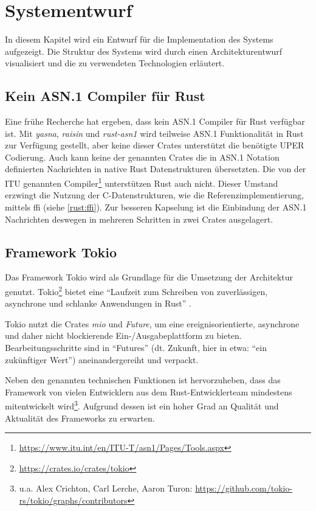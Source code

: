 
\chapter{Systementwurf}

In diesem Kapitel wird ein Entwurf für die Implementation des Systems aufgezeigt.
Die Struktur des Systems wird durch einen Architekturentwurf visualisiert und die zu verwendeten Technologien erläutert.

\section{Kein ASN.1 Compiler für Rust}
\label{draft:no_asn_compiler}

Eine frühe Recherche hat ergeben, dass kein ASN.1 Compiler für Rust verfügbar ist.
Mit \textit{yasna}, \textit{raisin} und \textit{rust-asn1} wird teilweise ASN.1 Funktionalität in Rust zur Verfügung gestellt, aber keine dieser Crates unterstützt die benötigte UPER Codierung.
Auch kann keine der genannten Crates die in ASN.1 Notation definierten Nachrichten in native Rust Datenstrukturen übersetzten.
Die von der ITU genannten Compiler\footnote{\url{https://www.itu.int/en/ITU-T/asn1/Pages/Tools.aspx}} unterstützen Rust auch nicht.
Dieser Umstand erzwingt die Nutzung der C-Datenstrukturen, wie die Referenzimplementierung, mittels \gls{ffi} (siehe \autoref{rust:ffi}).
Zur besseren Kapselung ist die Einbindung der ASN.1 Nachrichten deswegen in mehreren Schritten in zwei Crates ausgelagert.

\section{Framework Tokio}
\label{design:tokio}

Das Framework Tokio wird als Grundlage für die Umsetzung der Architektur genutzt.
Tokio\footnote{\url{https://crates.io/crates/tokio}} bietet eine \enquote{Laufzeit zum Schreiben von zuverlässigen, asynchrone und schlanke Anwendungen in Rust} \cite{rust:crate:tokio}.

Tokio nutzt die Crates \textit{mio} und \textit{Future}, um eine ereignisorientierte, asynchrone und daher nicht blockierende Ein-/Ausgabeplattform zu bieten.
Bearbeitungsschritte sind in \enquote{Futures} (dt. Zukunft, hier in etwa: \enquote{ein zukünftiger Wert}) aneinandergereiht und verpackt.

Neben den genannten technischen Funktionen ist hervorzuheben, dass das Framework von vielen Entwicklern aus dem Rust-Entwicklerteam mindestens mitentwickelt wird\footnote{u.a. Alex Crichton, Carl Lerche, Aaron Turon: \url{https://github.com/tokio-rs/tokio/graphs/contributors}}.
Aufgrund dessen ist ein hoher Grad an Qualität und Aktualität des Frameworks zu erwarten.

